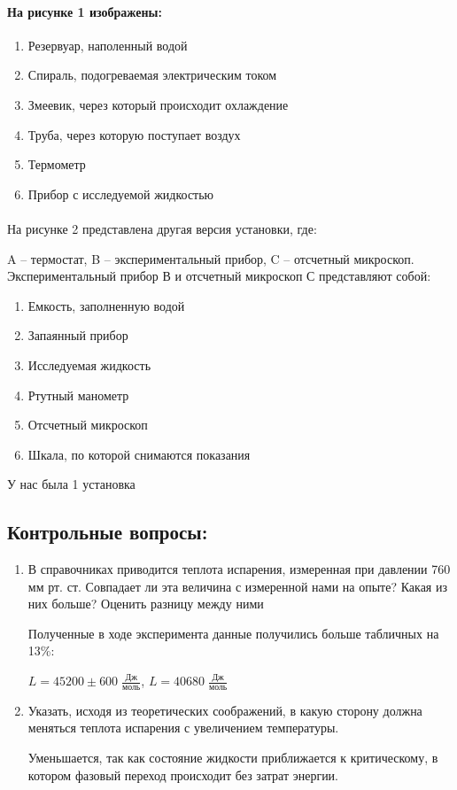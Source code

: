 \documentclass[a4paper,12pt]{article}
\begin{document}
\paragraph{На рисунке 1 изображены:} 
\begin{enumerate}
\itemsep0em
\item Резервуар, наполенный водой
\item Спираль, подогреваемая электрическим током
\item Змеевик, через который происходит охлаждение
\item Труба, через которую поступает воздух
\item Термометр
\item Прибор с исследуемой жидкостью
\end{enumerate}

\paragraph{}На рисунке 2 представлена другая версия установки, где:

A -- термостат, B -- экспериментальный прибор, C --  отсчетный микроскоп. 
Экспериментальный прибор В и отсчетный микроскоп С представляют собой:
\begin{enumerate}
\itemsep0em
\setcounter{enumi}{11}
\item Емкость, заполненную водой
\item Запаянный прибор 
\item Исследуемая жидкость 
\item Ртутный манометр
\item Отсчетный микроскоп
\item Шкала, по которой снимаются показания
\end{enumerate}

У нас была 1 установка
\subsection{Контрольные вопросы:}
\begin{enumerate}
\itemsep0em
\item В справочниках приводится теплота испарения, измеренная при давлении 760 мм рт. ст. Совпадает ли эта величина с измеренной нами на опыте? Какая из них больше? Оценить разницу между ними

	Полученные в ходе эксперимента данные получились больше табличных на 13\%:

  $L = 45200 \pm 600 \; \frac{\text{Дж}}{\text{моль}}$,  $L = 40680 \; \frac{\text{Дж}}{\text{моль}}$
\item Указать, исходя из теоретических соображений, в какую сторону должна меняться теплота испарения с увеличением температуры.

	Уменьшается, так как состояние жидкости приближается к критическому, в котором фазовый переход происходит без затрат энергии.

\end{enumerate}
\end{document}
